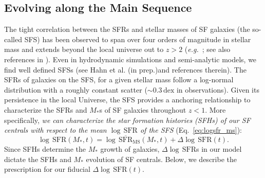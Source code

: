 \documentclass[12pt, letterpaper, preprint]{aastex}
\newcommand{\beq}{\begin{equation}}
\newcommand{\eeq}{\end{equation}}
\newcommand{\logsfr}{\log \, \mathrm{SFR}}
\newcommand{\hahngmm}{Hahn et al. (in prep.)}
\begin{document}
\subsection{Evolving along the Main Sequence} \label{sec:modelevol} 
The tight correlation between the SFRs and stellar masses of SF 
galaxies (the so-called SFS) has been observed to span over four 
orders of magnitude in stellar mass and extends beyond the local 
universe out to $z > 2$ 
(\emph{e.g.}~\citealt{noeske2007,daddi2007,elbaz2007,salim2007,santini2009,karim2011,whitaker2012,moustakas2013,lee2015}; see also references in \citealt{speagle2014}). 
Even in hydrodynamic simulations and semi-analytic models, we find 
well defined SFSs (see \hahngmm and references therein). The SFRs 
of galaxies on the SFS, for a given stellar mass follow a log-normal 
distribution with a roughly constant scatter ($\sim0.3\,\mathrm{dex}$ 
in observations).  %
Given its persistence in the local Universe, the SFS provides a 
anchoring relationship to characterize the SFRs and $M_*$s of SF 
galaxies throughout $z < 1$. More specifically, \emph{we can characterize 
the star formation histories (SFHs) of our SF centrals with respect 
to the mean $\logsfr$ of the SFS} (Eq.~\ref{eq:logsfr_ms}):
\beq \label{eq:logsfr_sf} 
\logsfr(M_*, t) = \log\,\overline{\mathrm{SFR}}_\mathrm{MS}(M_*, t) + \Delta \logsfr(t).
\eeq
Since SFHs determine the $M_*$ growth of galaxies, $\Delta \logsfr$s
in our model dictate the SFHs and $M_*$ evolution of SF centrals. 
Below, we describe the prescription for our fiducial $\Delta \logsfr(t)$.
\end{document}
